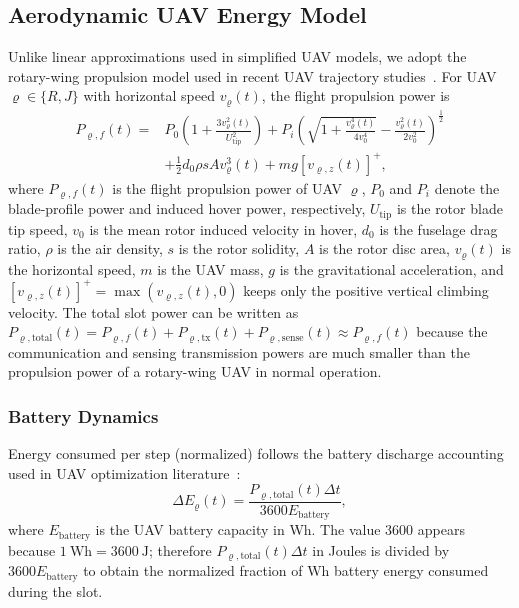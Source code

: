 \documentclass[journal]{IEEEtran}
\begin{document}
\subsection{Aerodynamic UAV Energy Model}
Unlike linear approximations used in simplified UAV models, we adopt the rotary-wing propulsion model used in recent UAV trajectory studies~\cite{zeng2019energy, pandeydualuav2026, pandeyaoidrl2025}. For UAV $\varrho\in\{R,J\}$ with horizontal speed $v_{\varrho}(t)$, the flight propulsion power is
\begin{equation}
\begin{aligned}
P_{\varrho,f}(t)={}&P_0\left(1+\frac{3v_{\varrho}^2(t)}{U_{\text{tip}}^2}\right)
+P_i\left(\sqrt{1+\frac{v_{\varrho}^4(t)}{4v_0^4}}-\frac{v_{\varrho}^2(t)}{2v_0^2}\right)^{\frac{1}{2}} \\
&+\frac{1}{2}d_0\rho sA v_{\varrho}^3(t)+m g [v_{\varrho,z}(t)]^+ ,
\end{aligned}
\label{eq:power}
\end{equation}
where $P_{\varrho,f}(t)$ is the flight propulsion power of UAV $\varrho$, $P_0$ and $P_i$ denote the blade-profile power and induced hover power, respectively, $U_{\text{tip}}$ is the rotor blade tip speed, $v_0$ is the mean rotor induced velocity in hover, $d_0$ is the fuselage drag ratio, $\rho$ is the air density, $s$ is the rotor solidity, $A$ is the rotor disc area, $v_{\varrho}(t)$ is the horizontal speed, $m$ is the UAV mass, $g$ is the gravitational acceleration, and $[v_{\varrho,z}(t)]^+=\max(v_{\varrho,z}(t),0)$ keeps only the positive vertical climbing velocity. The total slot power can be written as $P_{\varrho,\text{total}}(t)=P_{\varrho,f}(t)+P_{\varrho,\text{tx}}(t)+P_{\varrho,\text{sense}}(t)\approx P_{\varrho,f}(t)$ because the communication and sensing transmission powers are much smaller than the propulsion power of a rotary-wing UAV in normal operation.

\subsubsection{Battery Dynamics}
Energy consumed per step (normalized) follows the battery discharge accounting used in UAV optimization literature~\cite{pandeydualuav2026, pandeyaoidrl2025}:
\begin{equation}
\Delta E_{\varrho}(t) = \frac{P_{\varrho,\text{total}}(t)\Delta t}{3600 E_{\text{battery}}},
\label{eq:battery}
\end{equation}
where $E_{\text{battery}}$ is the UAV battery capacity in Wh. The value 3600 appears because $1~\text{Wh}=3600~\text{J}$; therefore $P_{\varrho,\text{total}}(t)\Delta t$ in Joules is divided by $3600E_{\text{battery}}$ to obtain the normalized fraction of Wh battery energy consumed during the slot.
\end{document}
